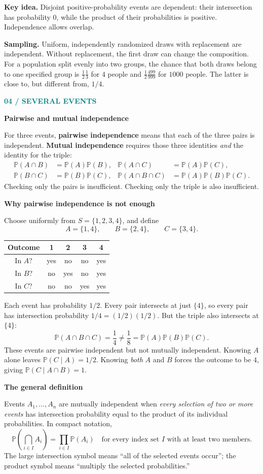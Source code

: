 \documentclass[11pt,letterpaper]{article}
\newcommand{\Pp}{\mathbb{P}}
\newcommand{\sectionpage}[2]{\textcolor{teal}{\small\textbf{#1}}\par{\LARGE\bfseries\color{ink}#2}\par\medskip}
\newcommand{\takeaway}[1]{\par\smallskip\noindent\colorbox{pale}{\parbox{\dimexpr\linewidth-2\fboxsep\relax}{\textbf{Key idea.} #1}}\par\smallskip}
\newcommand{\minihead}[1]{\par\smallskip\textbf{\color{ink}#1}\par}
\begin{document}
\takeaway{Disjoint positive-probability events are dependent: their intersection has probability $0$, while the product of their probabilities is positive. Independence allows overlap.}

\textbf{Sampling.} Uniform, independently randomized draws with replacement are independent. Without replacement, the first draw can change the composition. For a population split evenly into two groups, the chance that both draws belong to one specified group is $\frac12\frac13$ for $4$ people and $\frac12\frac{499}{999}$ for $1000$ people. The latter is close to, but different from, $1/4$.

\newpage
\sectionpage{04 / SEVERAL EVENTS}{Pairwise and mutual independence}
For three events, \textbf{pairwise independence} means that each of the three pairs is independent. \textbf{Mutual independence} requires those three identities \emph{and} the identity for the triple:
\begin{align*}
\Pp(A\cap B)&=\Pp(A)\Pp(B), & \Pp(A\cap C)&=\Pp(A)\Pp(C),\\
\Pp(B\cap C)&=\Pp(B)\Pp(C), & \Pp(A\cap B\cap C)&=\Pp(A)\Pp(B)\Pp(C).
\end{align*}
Checking only the pairs is insufficient. Checking only the triple is also insufficient.

\minihead{Why pairwise independence is not enough}
Choose uniformly from $S=\{1,2,3,4\}$, and define
\[
A=\{1,4\},\qquad B=\{2,4\},\qquad C=\{3,4\}.
\]
\begin{center}
\begin{tabular}{@{}ccccc@{}}\toprule
Outcome & 1 & 2 & 3 & 4\\\midrule
In $A$? & yes & no & no & yes\\
In $B$? & no & yes & no & yes\\
In $C$? & no & no & yes & yes\\\bottomrule
\end{tabular}
\end{center}
Each event has probability $1/2$. Every pair intersects at just $\{4\}$, so every pair has intersection probability $1/4=(1/2)(1/2)$. But the triple also intersects at $\{4\}$:
\[
\Pp(A\cap B\cap C)=\frac14\ne\frac18=\Pp(A)\Pp(B)\Pp(C).
\]
These events are pairwise independent but not mutually independent. Knowing $A$ alone leaves $\Pp(C\mid A)=1/2$. Knowing \emph{both} $A$ and $B$ forces the outcome to be $4$, giving $\Pp(C\mid A\cap B)=1$.

\minihead{The general definition}
Events $A_1,\ldots,A_n$ are mutually independent when \emph{every selection of two or more events} has intersection probability equal to the product of its individual probabilities. In compact notation,
\[
\Pp\!\left(\bigcap_{i\in I}A_i\right)=\prod_{i\in I}\Pp(A_i)
\quad\text{for every index set }I\text{ with at least two members}.
\]
The large intersection symbol means ``all of the selected events occur''; the product symbol means ``multiply the selected probabilities.''
\end{document}
